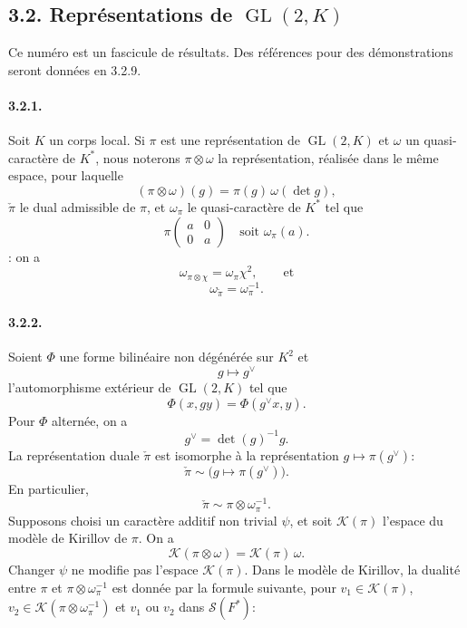 \documentclass[10pt,a4paper]{article}
\providecommand{\GL}{\operatorname{GL}}
\providecommand{\cK}{\mathcal K}
\providecommand{\cS}{\mathcal S}
\begin{document}
\clearpage
{}
\hypertarget{authority-41}{}
\subsection*{3.2. Représentations de \(\GL(2,K)\)}

Ce numéro est un fascicule de résultats. Des références pour des démonstrations seront données en 3.2.9.

\paragraph{3.2.1.} Soit \(K\) un corps local. Si \(\pi\) est une représentation de \(\GL(2,K)\) et \(\omega\) un quasi-caractère de \(K^*\), nous noterons \(\pi\otimes\omega\) la représentation, réalisée dans le même espace, pour laquelle
\[
(\pi\otimes\omega)(g)=\pi(g)\,\omega(\det g),
\]
\(\check\pi\) le dual admissible de \(\pi\), et \(\omega_\pi\) le quasi-caractère de \(K^*\) tel que
\[
\pi\!\left(\begin{smallmatrix}a&0\\0&a\end{smallmatrix}\right)\quad\text{soit }\omega_\pi(a).
\]
: on a
\[
\tag{3.2.1.1}
\omega_{\pi\otimes\chi}=\omega_\pi\chi^2,
\qquad\text{et}
\]
\[
\tag{3.2.1.2}
\omega_{\check\pi}=\omega_\pi^{-1}.
\]

\paragraph{3.2.2.} Soient \(\Phi\) une forme bilinéaire non dégénérée sur \(K^2\) et
\[
g\longmapsto g^\vee
\]
l'automorphisme extérieur de \(\GL(2,K)\) tel que
\[
\Phi(x,gy)=\Phi(g^\vee x,y).
\]
Pour \(\Phi\) alternée, on a
\[
g^\vee=\det(g)^{-1}g.
\]
La représentation duale \(\check\pi\) est isomorphe à la représentation \(g\mapsto\pi(g^\vee)\):
\[
\tag{3.2.2.1}
\check\pi\sim\bigl(g\longmapsto\pi(g^\vee)\bigr).
\]
En particulier,
\[
\tag{3.2.2.2}
\check\pi\sim\pi\otimes\omega_\pi^{-1}.
\]
Supposons choisi un caractère additif non trivial \(\psi\), et soit \(\cK(\pi)\) l'espace du modèle de Kirillov de \(\pi\). On a
\[
\tag{3.2.2.3}
\cK(\pi\otimes\omega)=\cK(\pi)\,\omega.
\]
Changer \(\psi\) ne modifie pas l'espace \(\cK(\pi)\). Dans le modèle de Kirillov, la dualité entre \(\pi\) et \(\pi\otimes\omega_\pi^{-1}\) est donnée par la formule suivante, pour \(v_1\in\cK(\pi)\), \(v_2\in\cK(\pi\otimes\omega_\pi^{-1})\) et \(v_1\) ou \(v_2\) dans \(\cS(F^*)\):
\end{document}
